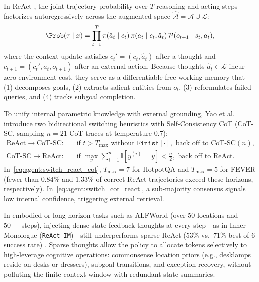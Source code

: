 \documentclass[../../../../master.tex]{subfiles}
\begin{document}
\begin{coremath}
In ReAct , the joint trajectory probability over $T$ reasoning-and-acting steps factorizes autoregressively across the augmented space $\hat{\mathcal{A}} = \mathcal{A} \cup \mathcal{L}$:
\begin{equation}
  \Prob(\tau \mid x) = \prod_{t=1}^{T} \pi(\hat{a}_t \mid c_t) \, \pi(a_t \mid c_t, \hat{a}_t) \, \mathcal{P}(o_{t+1} \mid s_t, a_t),
  \label{eq:agent:react_factorization}
\end{equation}
where the context update satisfies $c_t' = (c_t, \hat{a}_t)$ after a thought and $c_{t+1} = (c_t', a_t, o_{t+1})$ after an external action. Because thoughts $\hat{a}_t \in \mathcal{L}$ incur zero environment cost, they serve as a differentiable-free working memory that (1) decomposes goals, (2) extracts salient entities from $o_t$, (3) reformulates failed queries, and (4) tracks subgoal completion.

To unify internal parametric knowledge with external grounding, Yao et al.~ introduce two bidirectional switching heuristics with Self-Consistency CoT (CoT-SC, sampling $n=21$ CoT traces at temperature $0.7$):
\begin{align}
  \text{ReAct} \to \text{CoT-SC}: \quad & \text{if } t > T_{\max} \text{ without } \texttt{Finish}[\cdot], \text{ back off to } \text{CoT-SC}(n), \label{eq:agent:switch_react_cot} \\
  \text{CoT-SC} \to \text{ReAct}: \quad & \text{if } \max_{y} \sum_{i=1}^{n} \mathbb{I}[y^{(i)} = y] < \frac{n}{2}, \text{ back off to ReAct}. \label{eq:agent:switch_cot_react}
\end{align}
In~\eqref{eq:agent:switch_react_cot}, $T_{\max} = 7$ for HotpotQA and $T_{\max} = 5$ for FEVER (fewer than $0.84\%$ and $1.33\%$ of correct ReAct trajectories exceed these horizons, respectively). In~\eqref{eq:agent:switch_cot_react}, a sub-majority consensus signals low internal confidence, triggering external retrieval.
\end{coremath}

\begin{intuition}
In embodied or long-horizon tasks such as ALFWorld (over $50$ locations and $50+$ steps), injecting dense state-feedback thoughts at every step---as in Inner Monologue (\texttt{ReAct-IM})---still underperforms sparse ReAct ($53\%$ vs.\ $71\%$ best-of-6 success rate) . Sparse thoughts allow the policy to allocate tokens selectively to high-leverage cognitive operations: commonsense location priors (e.g., desklamps reside on desks or dressers), subgoal transitions, and exception recovery, without polluting the finite context window with redundant state summaries.
\end{intuition}
\end{document}
